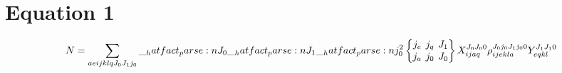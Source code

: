 \documentclass{scrartcl}
\newcommand{\sixj}[6]{\begingroup\setlength{\arraycolsep}{0.2em}\begin{Bmatrix} #1 & #2 & #3 \\ #4 & #5 & #6 \end{Bmatrix}\endgroup}
\begin{document}
\section{Equation 1}
\begin{dmath*}
N = \sum_{a e i j k l q {J}_{0} {J}_{1} {j}_{0}} \* \hatfact{{J}_{0}} \* \hatfact{{J}_{1}} \* \hatfact{{j}_{0}^{2}} \* \sixj{{j}_{e}}{{j}_{q}}{{J}_{1}}{{j}_{a}}{{j}_{0}}{{J}_{0}} \* X_{i j a q}^{{J}_{0} {J}_{0} 0} \* \rho_{i j e k l a}^{{J}_{0} {j}_{0} {J}_{1} {j}_{0} 0} \* Y_{e q k l}^{{J}_{1} {J}_{1} 0}
\end{dmath*}
\end{document}
